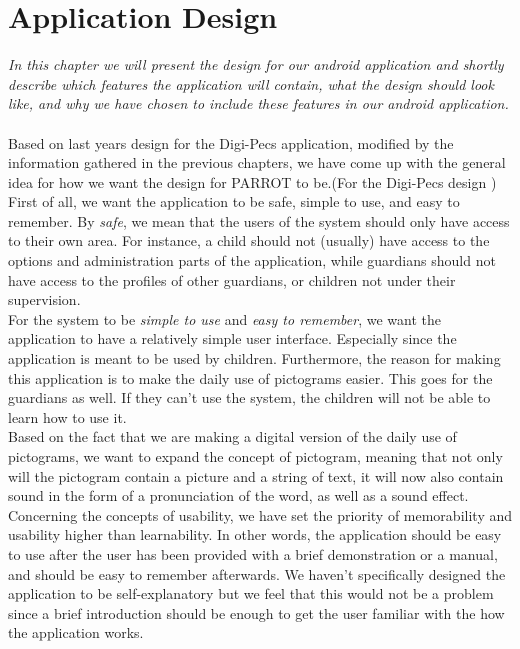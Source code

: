 \chapter{Application Design}
\label{appd}
\textit{In this chapter we will present the design for our android application and shortly describe which features the application will contain, what the design should look like, and why we have chosen to include these features in our android application.}\\
\label{appdes}
\\
Based on last years design for the Digi-Pecs application, modified by the information gathered in the previous chapters, we have come up with the general idea for how we want the design for PARROT to be.(For the Digi-Pecs design \cite{digipecs} )\newline
First of all, we want the application to be safe, simple to use, and easy to remember.\newline
By \textit{safe}, we mean that the users of the system should only have access to their own area. For instance, a child should not (usually) have access to the options and administration parts of the application, while guardians should not have access to the profiles of other guardians, or children not under their supervision.\newline
\\
For the system to be \textit{simple to use} and \textit{easy to remember}, we want the application to have a relatively simple user interface. Especially since the application is meant to be used by children. Furthermore, the reason for making this application is to make the daily use of pictograms easier. This goes for the guardians as well. If they can't use the system, the children will not be able to learn how to use it.\newline
\\
Based on the fact that we are making a digital version of the daily use of pictograms, we want to expand the concept of pictogram, meaning that not only will the pictogram contain a picture and a string of text, it will now also contain sound in the form of a pronunciation of the word, as well as a sound effect.
Concerning the concepts of usability, we have set the priority of memorability and usability higher than learnability. In other words, the application should be easy to use after the user has been provided with a brief demonstration or a manual, and should be easy to remember afterwards. We haven't specifically designed the application to be self-explanatory but we feel that this would not be a problem since a brief introduction should be enough to get the user familiar with the how the application works.    

